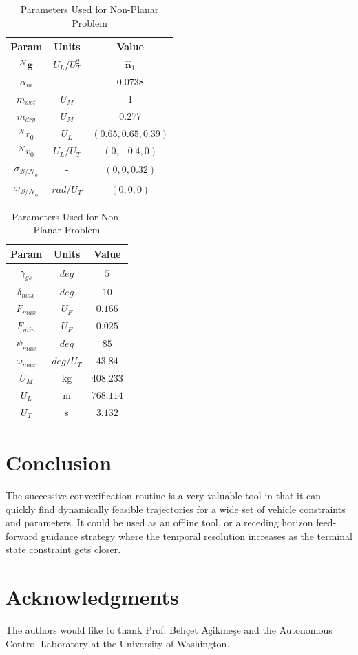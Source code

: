 \documentclass[conf]{new-aiaa}
\begin{document}
\begin{table}[ht]
  \caption{Parameters Used for Non-Planar Problem}
  \centering 
  \begin{tabular}{c c c} 
    \hline\hline
    Param & Units & Value \\ [0.5ex] 
    \hline 
    $^\mathcal{N}\mathbf{g}$ 		& $U_L/U_T^2$ 	& $\hat{\mathbf{n}}_1$  \\ 
    $\alpha_{\dot{m}}$ 				& - 			& 0.0738  \\
    $m_{wet}$ 						& $U_M$ 		& 1  \\
    $m_{dry}$ 						& $U_M$ 		& 0.277  \\
    $^\mathcal{N}r_{0}$ 			& $U_L$ 		& $(0.65,0.65,0.39)$  \\
    $^\mathcal{N}v_{0}$ 			& $U_L/U_T$	 	& $(0,-0.4,0)$  \\
    $\sigma_{\mathcal{B/N}_0}$ 		& - 			& $(0,0,0.32)$  \\
    $\omega_{\mathcal{B/N}_0}$ 		& $rad/U_T$ 	& $(0,0,0)$ \\[1ex] 
    \hline
    \end{tabular}
    \begin{tabular}{c c c} 
    \hline\hline
    Param & Units & Value \\ [0.5ex] 
    \hline 
    $\gamma_{gs}$ 					& $deg$ 		& $5$  \\ 
    $\delta_{max}$	 				& $deg$ 		& $10$  \\
    $F_{max}$ 						& $U_F$ 		& $0.166$ \\
    $F_{min}$ 						& $U_F$ 		& $0.025$  \\
    $\psi_{max}$ 					& $deg$ 		& $85$  \\
    $\omega_{max}$ 					& $deg/U_T$	 	& $43.84$  \\
    $U_M$ 							& kg 			& $408.233$  \\
    $U_L$					 		& m			 	& $768.114$ \\
    $U_T$					 		& s			 	& $3.132$ \\[1ex] 
    \hline
  \end{tabular}
  \label{table:tablenplanar}
\end{table}









\clearpage
\section{Conclusion}
The successive convexification routine is a very valuable tool in that it can quickly find dynamically feasible trajectories for a wide set of vehicle constraints and parameters. It could be used as an offline tool, or a receding horizon feed-forward guidance strategy where the temporal resolution increases as the terminal state constraint gets closer. 

\section*{Acknowledgments}
The authors would like to thank Prof. Behçet Açikmeşe and the Autonomous Control Laboratory at the University of Washington.

\begin{singlespace} 

\end{singlespace}
\end{document}
